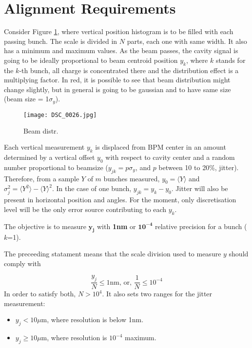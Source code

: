 \section{Alignment Requirements}
Consider Figure \ref{beamdist}, where vertical position histogram is to be filled with each passing bunch. The scale is divided in $N$ parts, each one with same width. It also has a minimum and maximum values. As the beam passes, the cavity signal is going to be ideally proportional to beam centroid position $y_k$, where $k$ stands for the $k$-th bunch, all charge is concentrated there and the distribution effect is a multiplying factor. In red, it is possible to see that beam distribution might change slightly, but in general is going to be gaussian and to have same size (beam size = 1$\sigma_y$).
\begin{figure}[htb]
\begin{center}
 \texttt{[image: DSC\_0026.jpg]}\caption{Beam distr.}\label{beamdist}
 \end{center}
\end{figure}
Each vertical measurement $y_k$ is displaced from BPM center in an amount determined by a vertical offset $y_0$ with respect to cavity center and a random number proportional to beamsize ($y_{jk}=p\sigma_y$, and $p$ between 10 to 20\%, jitter). Therefore, from a sample $Y$ of $m$ bunches measured, $y_0=\langle Y\rangle$ and $\sigma_j^2=\langle Y^2\rangle-\langle Y\rangle^2$. In the case of one bunch, $y_{jk}=y_k-y_0$. Jitter will also be present in horizontal position and angles. For the moment, only discretisation level will be the only error source contributing to each $y_k$.\par
The objective is to measure $\boldsymbol{y_j}$ with \textbf{1nm} or $\boldsymbol{10^{-4}}$ relative precision for a bunch ($k$=1).\par
The preceeding statament means that the scale division used to measure $y$ should comply with\par
\begin{equation}
  \frac{y_j}{N}\leq1\text{nm, or, }\frac{1}{N}\leq10^{-4}
\end{equation}
In order to satisfy both, $N>10^{4}$. It also sets two ranges for the jitter measurement:
\begin{itemize}
 \item $y_j<10\mu$m, where resolution is below 1nm.
 \item $y_j\geq10\mu$m, where resolution is $10^{-4}$ maximum.
\end{itemize}
